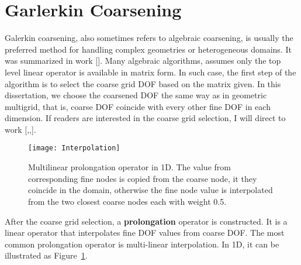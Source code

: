 \section{Garlerkin Coarsening}
Galerkin coarsening, also sometimes refers to algebraic coarsening, is usually the preferred method for handling complex geometries or heterogeneous domains. It was summarized in work [\cite{brandt1986algebraic}]. Many algebraic algorithms, assumes only the top level linear operator is available in matrix form. In such case, the first step of the algorithm is to select the coarse grid DOF based on the matrix given. In this dissertation, we choose the coarsened DOF the same way as in geometric multigrid, that is, coarse DOF coincide with every other fine DOF in each dimension. If readers are interested in the coarse grid selection, I will direct to work [\cite{vanvek1996algebraic},\cite{brandt1986algebraic},\cite{griebel2003algebraic}].

\begin{figure}[t]
\centering
\texttt{[image: Interpolation]}
  \caption{Multilinear prolongation operator in 1D. The value from corresponding fine nodes is copied from the coarse node, it they coincide in the domain, otherwise the fine node value is interpolated from the two closest coarse nodes each with weight 0.5.}
  \label{fig:MultilinearInterpolation}
\end{figure}

After the coarse grid selection, a \textbf{prolongation} operator is constructed. It is a linear operator that interpolates fine DOF values from coarse DOF. The most common prolongation operator is multi-linear interpolation. In 1D, it can be illustrated as Figure~\ref{fig:MultilinearInterpolation}.

